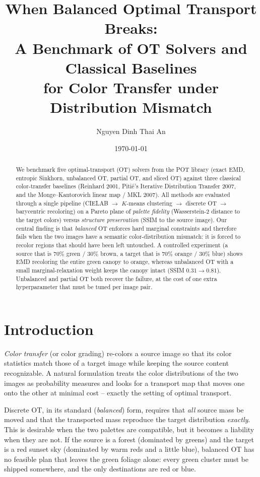 \documentclass[11pt,a4paper]{article}
\title{\textbf{When Balanced Optimal Transport Breaks:\\
A Benchmark of OT Solvers and Classical Baselines\\
for Color Transfer under Distribution Mismatch}}
\author{Nguyen Dinh Thai An}
\date{\today}
\begin{document}
\maketitle

\begin{abstract}
We benchmark five optimal-transport (OT) solvers from the POT library
(exact EMD, entropic Sinkhorn, unbalanced OT, partial OT, and sliced OT)
against three classical color-transfer baselines
(Reinhard 2001, Piti\'e's Iterative Distribution Transfer 2007, and the
Monge--Kantorovich linear map / MKL 2007).
All methods are evaluated through a single pipeline
(CIELAB $\to$ $K$-means clustering $\to$ discrete OT $\to$ barycentric recoloring)
on a Pareto plane of \emph{palette fidelity} (Wasserstein-2 distance to the target
colors) versus \emph{structure preservation} (SSIM to the source image).
Our central finding is that \emph{balanced} OT enforces hard marginal
constraints and therefore fails when the two images have a semantic
color-distribution mismatch: it is forced to recolor regions that should have
been left untouched.
A controlled experiment (a source that is $70\%$ green / $30\%$ brown, a target
that is $70\%$ orange / $30\%$ blue) shows EMD recoloring the entire green canopy
to orange, whereas unbalanced OT with a small marginal-relaxation weight keeps
the canopy intact (SSIM $0.31\!\to\!0.81$). Unbalanced and partial OT both
recover the failure, at the cost of one extra hyperparameter that must be tuned
per image pair.
\end{abstract}

\section{Introduction}

\emph{Color transfer} (or color grading) re-colors a source image so that its
color statistics match those of a target image while keeping the source content
recognizable. A natural formulation treats the color distributions of the two
images as probability measures and looks for a transport map that moves one onto
the other at minimal cost -- exactly the setting of optimal transport.

Discrete OT, in its standard (\emph{balanced}) form, requires that \emph{all}
source mass be moved and that the transported mass reproduce the target
distribution \emph{exactly}. This is desirable when the two palettes are
compatible, but it becomes a liability when they are not. If the source is a
forest (dominated by greens) and the target is a red sunset sky (dominated by
warm reds and a little blue), balanced OT has no feasible plan that leaves the
green foliage alone: every green cluster must be shipped somewhere, and the only
destinations are red or blue.
\end{document}
